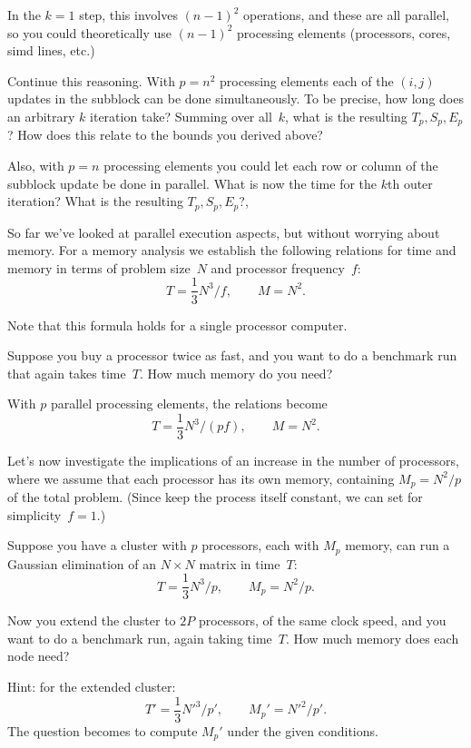 In the $k=1$ step, this involves $(n-1)^2$ operations,
and these are all parallel, so you could theoretically use $(n-1)^2$ processing elements
(processors, cores, simd lines, etc.)

\begin{exercise}
  \label{ex:gauss-n2parallel}
  Continue this reasoning.
  With $p=n^2$ processing elements each of the $(i,j)$ updates in the subblock
  can be done simultaneously.
  To be precise, how long does an arbitrary $k$ iteration take?
  Summing over all~$k$, what is the resulting $T_p, S_p,E_p$?
  How does this relate to the bounds you derived above?

  Also, with $p=n$ processing elements you could let each row or column of the subblock
  update be done in parallel. What is now the time for the $k$th outer iteration?
  What is the resulting $T_p, S_p,E_p$?,
\end{exercise}

So far we've looked at parallel execution aspects,
but without worrying about memory. 
For a memory analysis we establish the following relations
for time and memory in terms of problem size~$N$
and processor frequency~$f$:
\[ T=\frac 13 N^3/f,\qquad M=N^2. \]

Note that this formula holds for a single processor computer.

\begin{exercise}
  \label{ex:gauss-f2f}
  Suppose you buy a processor twice as fast, and you want to do a
  benchmark run that again takes time~$T$. How much memory do you need?
\end{exercise}

With $p$ parallel processing elements,
the relations become
\[ T=\frac 13 N^3/(pf),\qquad M=N^2. \]

Let's now investigate the implications of
an increase in the number of processors,
where we assume that each processor has its own memory,
containing $M_p=N^2/p$ of the total problem.
(Since keep the process itself constant, we can set
for simplicity~$f=1$.)

\begin{exercise}
  \label{ex:gauss-p2p}
  Suppose you have a cluster with $p$ processors, each with $M_p$
  memory, can run a Gaussian elimination of an $N\times N$
  matrix in time~$T$:
  \[ T=\frac 13 N^3/p,\qquad M_p=N^2/p. \]

  Now you extend the cluster to $2P$ processors, of the same clock speed,
  and you want to do a benchmark run, again taking time~$T$.
  How much memory does each node need?

  Hint: for the extended cluster:
  \[ T'=\frac 13 N'^3/p',\qquad M_p'=N'^2/p'. \]
  The question becomes to compute $M_p'$
  under the given conditions.
\end{exercise}

